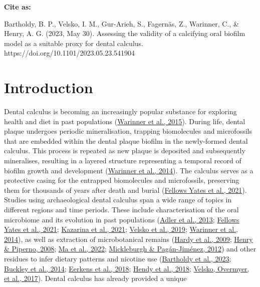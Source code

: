 \documentclass[
  b5paper,
]{book}
\begin{document}
\textbf{Cite as:}

Bartholdy, B. P., Velsko, I. M., Gur-Arieh, S., Fagernäs, Z., Warinner,
C., \& Henry, A. G. (2023, May 30). Assessing the validity of a
calcifying oral biofilm model as a suitable proxy for dental calculus.
https://doi.org/10.1101/2023.05.23.541904

\normalsize

\newpage{}

\hypertarget{introduction}{%
\section{Introduction}\label{introduction}}

Dental calculus is becoming an increasingly popular substance for
exploring health and diet in past populations
(\protect\hyperlink{ref-warinnerNewEra2015}{Warinner et al., 2015}).
During life, dental plaque undergoes periodic mineralisation, trapping
biomolecules and microfossils that are embedded within the dental plaque
biofilm in the newly-formed dental calculus. This process is repeated as
new plaque is deposited and subsequently mineralises, resulting in a
layered structure representing a temporal record of biofilm growth and
development (\protect\hyperlink{ref-warinnerPathogensHost2014}{Warinner
et al., 2014}). The calculus serves as a protective casing for the
entrapped biomolecules and microfossils, preserving them for thousands
of years after death and burial
(\protect\hyperlink{ref-yatesOralMicrobiome2021}{Fellows Yates et al.,
2021}). Studies using archaeological dental calculus span a wide range
of topics in different regions and time periods. These include
characterisation of the oral microbiome and its evolution in past
populations (\protect\hyperlink{ref-adlerSequencingAncient2013}{Adler et
al., 2013}; \protect\hyperlink{ref-yatesOralMicrobiome2021}{Fellows
Yates et al., 2021};
\protect\hyperlink{ref-kazarinaPostmedievalMicrobial2021}{Kazarina et
al., 2021};
\protect\hyperlink{ref-velskoMicrobialDifferences2019}{Velsko et al.,
2019}; \protect\hyperlink{ref-warinnerPathogensHost2014}{Warinner et
al., 2014}), as well as extraction of microbotanical remains
(\protect\hyperlink{ref-hardyStarchGranules2009}{Hardy et al., 2009};
\protect\hyperlink{ref-henryCalculusSyria2008}{Henry \& Piperno, 2008};
\protect\hyperlink{ref-maHumanDiet2022}{Ma et al., 2022};
\protect\hyperlink{ref-mickleburghNewInsights2012}{Mickleburgh \&
Pagán-Jiménez, 2012}) and other residues to infer dietary patterns and
nicotine use
(\protect\hyperlink{ref-bartholdyMultiproxyAnalysis2023}{Bartholdy et
al., 2023}; \protect\hyperlink{ref-buckleyDentalCalculus2014}{Buckley et
al., 2014}; \protect\hyperlink{ref-eerkensDentalCalculus2018}{Eerkens et
al., 2018}; \protect\hyperlink{ref-hendyProteomicCalculus2018}{Hendy et
al., 2018}; \protect\hyperlink{ref-velskoDentalCalculus2017}{Velsko,
Overmyer, et al., 2017}). Dental calculus has already provided a unique
\end{document}
